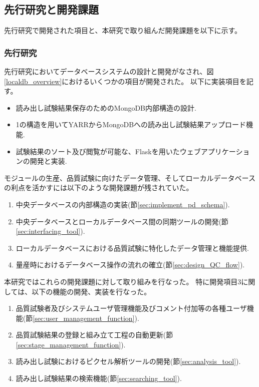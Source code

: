 \subsection{先行研究と開発課題}
先行研究で開発された項目と、本研究で取り組んだ開発課題を以下に示す。

\subsubsection{先行研究}
先行研究\cite{4-6}においてデータベースシステムの設計と開発がなされ、図\ref{localdb_overview}におけるいくつかの項目が開発された。
以下に実装項目を記す。
\begin{itemize}
  \item 読み出し試験結果保存のためのMongoDB内部構造の設計.
  \item 1の構造を用いてYARRからMongoDBへの読み出し試験結果アップロード機能.
  \item 試験結果のソート及び閲覧が可能な、Flaskを用いたウェブアプリケーションの開発と実装. 
\end{itemize}

モジュールの生産、品質試験に向けたデータ管理、そしてローカルデータベースの利点を活かすには以下のような開発課題が残されていた。
\begin{enumerate}
  \item 中央データベースの内部構造の実装(節\ref{sec:implement_pd_schema}).
  \item 中央データベースとローカルデータベース間の同期ツールの開発(節\ref{sec:interfacing_tool}).
  \item ローカルデータベースにおける品質試験に特化したデータ管理と機能提供.
  \item 量産時におけるデータベース操作の流れの確立(節\ref{sec:design_QC_flow}).
\end{enumerate}

本研究ではこれらの開発課題に対して取り組みを行なった。
特に開発項目3に関しては、以下の機能の開発、実装を行なった。
\begin{enumerate}
  \renewcommand{\labelenumi}{(\roman{enumi})} 
  \item 品質試験者及びシステムユーザ管理機能及びコメント付加等の各種ユーザ機能(節\ref{sec:user_management_function}).
  \item 品質試験結果の登録と組み立て工程の自動更新(節\ref{sec:stage_management_function}).
  \item 読み出し試験におけるピクセル解析ツールの開発(節\ref{sec:analysis_tool}).
  \item 読み出し試験結果の検索機能(節\ref{sec:searching_tool}).
\end{enumerate}

